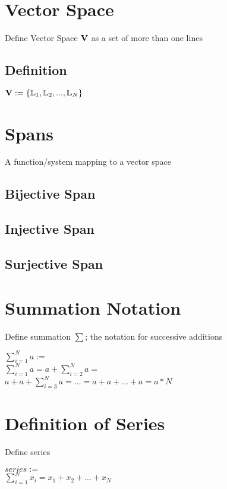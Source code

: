 \documentclass[11pt]{article}
\begin{document}
\section{Vector Space}
Define Vector Space $\bold{V}$ as a set of more than one lines
\subsection{Definition}
\begin{center}
$\bold{V} := \{ \mathbb{L}_1,\mathbb{L}_2,...,\mathbb{L}_N\}$
\end{center}



\section{Spans}
A function/system mapping to a vector space

\subsection{Bijective Span}
\subsection{Injective Span}
\subsection{Surjective Span}




\section{Summation Notation}
Define summation $\sum$; the notation for successive additions
\begin{center}
$\sum_{i=1}^{N} a :=$
\\ \vspace{2mm}
$\sum_{i=1}^{N} a = a + \sum_{i=2}^{N} a =$
\\ \vspace{2mm}
$a + a + \sum_{i=3}^{N} a = ... = a + a + ... + a = a * N$
\end{center}




\section{Definition of Series}
Define series
\begin{center}
$series :=$
\\ \vspace{2mm}
$\sum_{i=1}^{N} x_i = x_1 + x_2 + ... + x_N$
\end{center}
\end{document}

